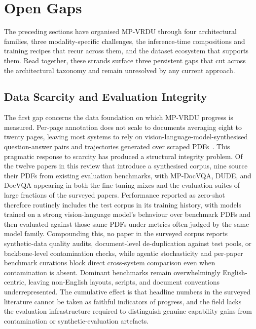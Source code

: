\documentclass[11pt]{article}
\begin{document}
\section{Open Gaps}
\label{sec:gaps}

The preceding sections have organised MP-VRDU through four architectural families, three modality-specific challenges, the inference-time compositions and training recipes that recur across them, and the dataset ecosystem that supports them. Read together, these strands surface three persistent gaps that cut across the architectural taxonomy and remain unresolved by any current approach.

\subsection{Data Scarcity and Evaluation Integrity}
\label{sec:gap-data}

The first gap concerns the data foundation on which MP-VRDU progress is measured. Per-page annotation does not scale to documents averaging eight to twenty pages, leaving most systems to rely on vision-language-model-synthesised question-answer pairs and trajectories generated over scraped PDFs~\cite{tanaka2024instructdoc,jain2025simpledoc,xiong2026docr1,zhang2026docdancer}. This pragmatic response to scarcity has produced a structural integrity problem. Of the twelve papers in this review that introduce a synthesised corpus, nine source their PDFs from existing evaluation benchmarks, with MP-DocVQA, DUDE, and DocVQA appearing in both the fine-tuning mixes and the evaluation suites of large fractions of the surveyed papers. Performance reported as zero-shot therefore routinely includes the test corpus in its training history, with models trained on a strong vision-language model's behaviour over benchmark PDFs and then evaluated against those same PDFs under metrics often judged by the same model family. Compounding this, no paper in the surveyed corpus reports synthetic-data quality audits, document-level de-duplication against test pools, or backbone-level contamination checks, while agentic stochasticity and per-paper benchmark curations block direct cross-system comparison even when contamination is absent. Dominant benchmarks remain overwhelmingly English-centric, leaving non-English layouts, scripts, and document conventions underrepresented. The cumulative effect is that headline numbers in the surveyed literature cannot be taken as faithful indicators of progress, and the field lacks the evaluation infrastructure required to distinguish genuine capability gains from contamination or synthetic-evaluation artefacts.
\end{document}
